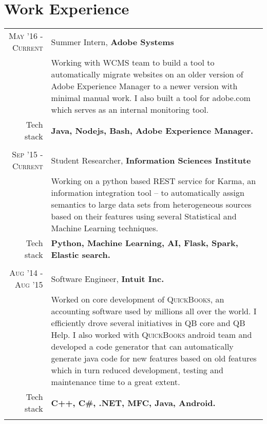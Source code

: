 \section{Work Experience}
\renewcommand{\arraystretch}{0.85}%
\begin{tabular}{r|p{13cm}}
\textsc{May '16 - Current} & Summer Intern, \textbf{Adobe Systems} \\
& \small{Working with WCMS team to build a tool to automatically migrate websites on an older version of Adobe Experience Manager to a newer version with minimal manual work. I also built a tool for adobe.com which serves as an internal monitoring tool.}\\
\small{Tech stack} &\footnotesize{\textbf{Java, Nodejs, Bash, Adobe Experience Manager.}} \\
\multicolumn{2}{c}{} \\

\textsc{Sep '15 - Current} & Student Researcher, \textbf{Information Sciences Institute} \\
& \small{Working on a python based REST service for Karma, an information integration tool – to automatically assign semantics to large data sets from heterogeneous sources based on their features using several Statistical and Machine Learning techniques.}\\
\small{Tech stack} &\footnotesize{\textbf{Python, Machine Learning, AI, Flask, Spark, Elastic search.}} \\
\multicolumn{2}{c}{} \\

\textsc{Aug '14 - Aug '15 } & Software Engineer, \textbf{Intuit Inc.} \\
& \small{Worked on core development of \textsc{QuickBooks}, an accounting software used by millions all over the world. I efficiently drove several initiatives in QB core and QB Help. I also worked with \textsc{QuickBooks} android team and developed a code generator that can automatically generate java code for new features based on old features which in turn reduced development, testing and maintenance time to a great extent.}\\
\small{Tech stack} &\footnotesize{\textbf{C++, C\#, .NET, MFC, Java, Android.}} \\
\multicolumn{2}{c}{}



\end{tabular}
